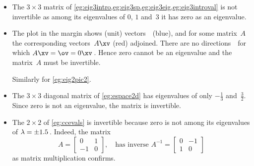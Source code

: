 \begin{example} 
\begin{itemize}
\item The \(3\times 3\) matrix of \autoref{eg:eig3intro,eg:eig3sp,eg:eig3eig,eg:eig3introval} is not invertible as among its eigenvalues of \(0\), \(1\) and~\(3\) it has zero as an eigenvalue.

\item The plot in the margin shows (unit) vectors~\xv\ (blue), and for some matrix~\(A\) the corresponding vectors~\(A\xv\) (red) adjoined.
%
There are no directions~\xv\ for which \(A\xv=\ov=0\xv\)\,. 
Hence zero cannot be an eigenvalue and the matrix~\(A\) must be invertible.

Similarly for \autoref{eg:eig2pic2}.

\item The \(3\times3\) diagonal matrix of \autoref{eg:espace2d} has eigenvalues of only \(-\tfrac13\) and~\(\tfrac32\).
Since zero is not an eigenvalue, the matrix is invertible.


\item The \(2\times2\)  of \autoref{eg:ccevals} is invertible because zero is not among its eigenvalues of \(\lambda=\pm 1.5\)\,.
Indeed, the matrix
\begin{equation*}
A=\begin{bmatrix} 0&1\\-1&0 \end{bmatrix},
\quad\text{has inverse }A^{-1}=\begin{bmatrix} 0&-1\\1&0 \end{bmatrix}
\end{equation*}
as matrix multiplication confirms.


\end{itemize}
\end{example}
